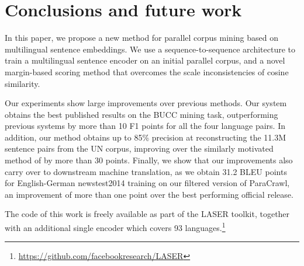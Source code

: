 \documentclass[11pt,a4paper]{article}
\begin{document}
\section{Conclusions and future work}
\label{sec:conclusions}

In this paper, we propose a new method for parallel corpus mining based on multilingual sentence embeddings.
We use a sequence-to-sequence architecture to train a multilingual sentence encoder on an initial parallel corpus, and a novel margin-based scoring method that overcomes the scale inconsistencies of cosine similarity.

Our experiments show large improvements over previous methods. Our system obtains the best published results on the BUCC mining task, outperforming previous systems by more than 10 F1 points for all the four language pairs. In addition, our method obtains up to 85\% precision at reconstructing the 11.3M sentence pairs from the UN corpus, improving over the similarly motivated method of \citet{guo:2018:wmt_effective} by more than 30 points. Finally, we show that our improvements also carry over to downstream machine translation, as we obtain 31.2 BLEU points for English-German newstest2014 training on our filtered version of ParaCrawl, an improvement of more than one point over the best performing official release.

The code of this work is freely available as part of the LASER toolkit, together with an additional single encoder which covers 93 languages.\footnote{\url{https://github.com/facebookresearch/LASER}}





\end{document}
